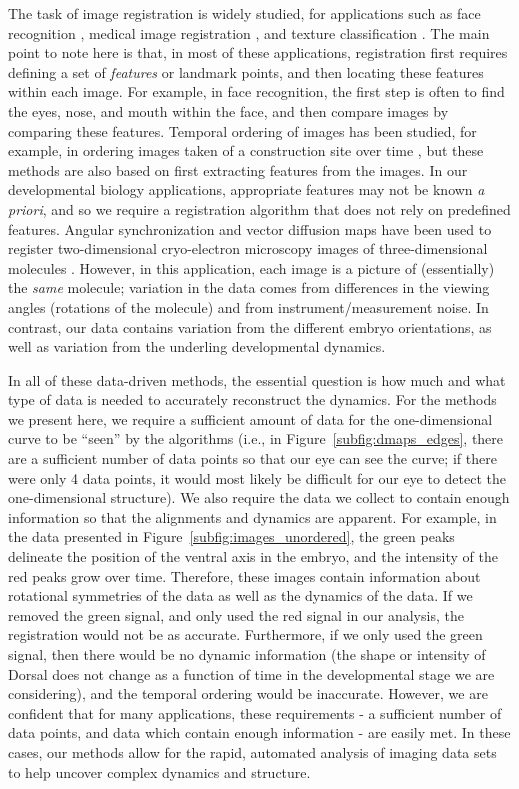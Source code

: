 \documentclass{pnastwo}
\begin{document}
\begin{article}
The task of image registration is widely studied, for applications such as face recognition \cite{rowley1998rotation}, medical image registration \cite{hajnal2010medical}, and texture classification \cite{greenspan1994rotation}.
%
The main point to note here is that, in most of these applications, registration first requires defining a set of {\em features} or landmark points, and then locating these features within each image.
%
For example, in face recognition, the first step is often to find the eyes, nose, and mouth within the face, and then compare images by comparing these features.
%
Temporal ordering of images has been studied, for example, in ordering images taken of a construction site over time \cite{schindler2007inferring}, 
but these methods are also based on first extracting features from the images. 
%
In our developmental biology applications, appropriate features may not be known {\em a priori}, and so we require a registration algorithm that does not rely on predefined features.
%
Angular synchronization and vector diffusion maps have been used to register two-dimensional cryo-electron microscopy images of three-dimensional molecules \cite{singer2011three}.
%
However, in this application, each image is a picture of (essentially) the {\em same} molecule; variation in the data comes from differences in the viewing angles (rotations of the molecule) and from instrument/measurement noise.
%
In contrast, our data contains variation from the different embryo orientations, as well as variation from the underling developmental dynamics. 

In all of these data-driven methods, the essential question is how much and what type of data is needed to accurately reconstruct the dynamics. 
%
For the methods we present here, we require a sufficient amount of data for the one-dimensional curve to be ``seen'' by the algorithms (i.e., in Figure~\ref{subfig:dmaps_edges}, there are a sufficient number of data points so that our eye can see the curve; if there were only 4 data points, it would most likely be difficult for our eye to detect the one-dimensional structure).
%
We also require the data we collect to contain enough information so that the alignments and dynamics are apparent.
%
For example, in the data presented in Figure~\ref{subfig:images_unordered}, the green peaks delineate the position of the ventral axis in the embryo, and the intensity of the red peaks grow over time.
%
Therefore, these images contain information about rotational symmetries of the data as well as the dynamics of the data.
%
If we removed the green signal, and only used the red signal in our analysis, the registration would not be as accurate.
%
Furthermore, if we only used the green signal, then there would be no dynamic information (the shape or intensity of Dorsal does not change as a function of time in the developmental stage we are considering), and the temporal ordering would be inaccurate.
%
However, we are confident that for many applications, these requirements - a sufficient number of data points, and data which contain enough information - are easily met. 
%
In these cases, our methods allow for the rapid, automated analysis of imaging data sets to help uncover complex dynamics and structure. 


\end{article}
\end{document}
